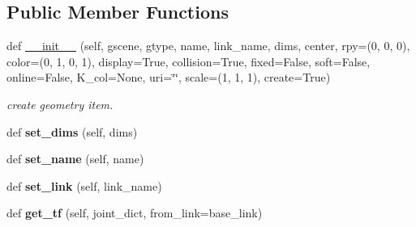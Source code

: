 \subsection*{Public Member Functions}
\begin{DoxyCompactItemize}
\item 
def \hyperlink{classrnb-planning_1_1src_1_1pkg_1_1geometry_1_1geometry_1_1_geometry_item_a22485caad590a4587c177a131397c778}{\+\_\+\+\_\+init\+\_\+\+\_\+} (self, gscene, gtype, name, link\+\_\+name, dims, center, rpy=(0, 0, 0), color=(0, 1, 0, 1), display=True, collision=True, fixed=False, soft=False, online=False, K\+\_\+col=None, uri=\char`\"{}\char`\"{}, scale=(1, 1, 1), create=True)
\begin{DoxyCompactList}\small\item\em create geometry item. \end{DoxyCompactList}\item 
\mbox{\label{classrnb-planning_1_1src_1_1pkg_1_1geometry_1_1geometry_1_1_geometry_item_a08280efef12a37de4be036dd31228270}} 
def {\bfseries set\+\_\+dims} (self, dims)
\item 
\mbox{\label{classrnb-planning_1_1src_1_1pkg_1_1geometry_1_1geometry_1_1_geometry_item_a8bc3c55057911300d360f92b2e5fabf6}} 
def {\bfseries set\+\_\+name} (self, name)
\item 
\mbox{\label{classrnb-planning_1_1src_1_1pkg_1_1geometry_1_1geometry_1_1_geometry_item_a6c983658f3f687b0dbb57394b05ac4e6}} 
def {\bfseries set\+\_\+link} (self, link\+\_\+name)
\item 
\mbox{\label{classrnb-planning_1_1src_1_1pkg_1_1geometry_1_1geometry_1_1_geometry_item_ad5e30e57885ec7a78d49e75a9f530004}} 
def {\bfseries get\+\_\+tf} (self, joint\+\_\+dict, from\+\_\+link=\textquotesingle{}base\+\_\+link\textquotesingle{})
\item 
\mbox{\label{classrnb-planning_1_1src_1_1pkg_1_1geometry_1_1geometry_1_1_geometry_item_a66f5b8c1c56f3b599849148bcc1437f8}} 

\end{DoxyCompactItemize}
